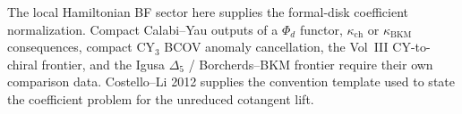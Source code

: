 \begin{rmk}\label{rmk:t4-external-comparison-boundary}
  The local Hamiltonian BF sector here supplies the formal-disk
  coefficient normalization.  Compact Calabi--Yau outputs of a
  \(\Phi_d\) functor, \(\kappa_{\mathrm{ch}}\) or
  \(\kappa_{\mathrm{BKM}}\) consequences, compact
  \(\mathrm{CY}_3\) BCOV anomaly cancellation, the Vol~III
  CY-to-chiral frontier, and the Igusa \(\Delta_5\) /
  Borcherds--BKM frontier require their own comparison data.
  Costello--Li 2012 supplies the convention template used to state the
  coefficient problem for the unreduced cotangent lift.
\end{rmk}
